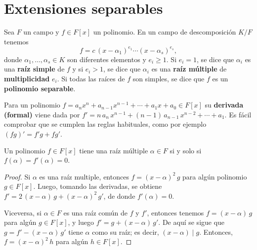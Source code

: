
\section{Extensiones separables}

\begin{definicion}
  Sea $F$ un campo y $f\in F [x]$ un polinomio. En un campo de descomposición
  $K/F$ tenemos
  $$f = c\,(x-\alpha_1)^{e_1} \cdots (x - \alpha_s)^{e_s},$$
  donde $\alpha_1,\ldots,\alpha_s \in K$ son diferentes elementos y
  $e_i \ge 1$. Si $e_i = 1$, se dice que $\alpha_i$ es una \textbf{raíz simple} de
  $f$ y si $e_i > 1$, se dice que $\alpha_i$ es una \textbf{raíz múltiple} de
  \textbf{multiplicidad} $e_i$. Si todas las raíces de $f$ son simples, se dice
  que $f$ es un \textbf{polinomio separable}.
\end{definicion}

Para un polinomio
$f = a_n x^n + a_{n-1} x^{n-1} + \cdots + a_1 x + a_0 \in F [x]$
su \textbf{derivada (formal)} viene dada por
$f' = n\,a_n\,x^{n-1} + (n-1)\,a_{n-1}\,x^{n-2} + \cdots + a_1$.
Es fácil comprobar que se cumplen las reglas habituales, como por ejemplo
$(fg)' = f' g + f g'$.

\begin{proposicion}
  Un polinomio $f \in F [x]$ tiene una raíz múltiple $\alpha \in F$ si y solo si
  $f (\alpha) = f' (\alpha) = 0$.

  \begin{proof}
    Si $\alpha$ es una raíz multiple, entonces $f = (x-\alpha)^2\,g$ para algún
    polinomio $g\in F [x]$. Luego, tomando las derivadas, se obtiene
    $f' = 2\,(x-\alpha)\,g + (x-\alpha)^2\,g'$, de donde $f' (\alpha) = 0$.

    Viceversa, si $\alpha \in F$ es una raíz común de $f$ y $f'$, entonces
    tenemos $f = (x-\alpha)\,g$ para algún $g \in F [x]$, y luego
    $f' = g + (x-\alpha)\,g'$.  De aquí se sigue que $g = f' - (x-\alpha)\,g'$
    tiene $\alpha$ como su raíz; es decir, $(x - \alpha) \mid g$. Entonces,
    $f = (x-\alpha)^2\,h$ para algún $h\in F [x]$.
  \end{proof}
\end{proposicion}

